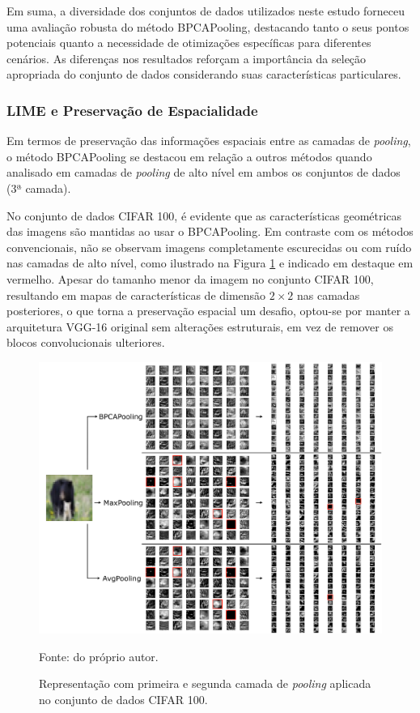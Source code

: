 Em suma, a diversidade dos conjuntos de dados utilizados neste estudo forneceu uma avaliação robusta do método BPCAPooling, destacando tanto o seus pontos potenciais quanto a necessidade de otimizações específicas para diferentes cenários. As diferenças nos resultados reforçam a importância da seleção apropriada do conjunto de dados considerando suas características particulares.

\subsubsection{LIME e Preservação de Espacialidade}
\label{results:class:lime}
Em termos de preservação das informações espaciais entre as camadas de \textit{pooling}, o método BPCAPooling se destacou em relação a outros métodos quando analisado em camadas de \textit{pooling} de alto nível em ambos os conjuntos de dados (3ª camada).

No conjunto de dados CIFAR 100, é evidente que as características geométricas das imagens são mantidas ao usar o BPCAPooling. Em contraste com os métodos convencionais, não se observam imagens completamente escurecidas ou com ruído nas camadas de alto nível, como ilustrado na Figura \ref{results:fig:datasets:5} e indicado em destaque em vermelho. Apesar do tamanho menor da imagem no conjunto CIFAR 100, resultando em mapas de características de dimensão $2 \times 2$ nas camadas posteriores, o que torna a preservação espacial um desafio, optou-se por manter a arquitetura VGG-16 original sem alterações estruturais, em vez de remover os blocos convolucionais ulteriores.

\begin{figure}[H]
    \centering
    \caption{Representação com primeira e segunda camada de \textit{pooling} aplicada no conjunto de dados CIFAR 100.}
    \label{results:fig:datasets:5}
    \includegraphics[width=1\textwidth]{recursos/imagens/results/cifar_blocks.png}

    Fonte: do próprio autor.
\end{figure}


